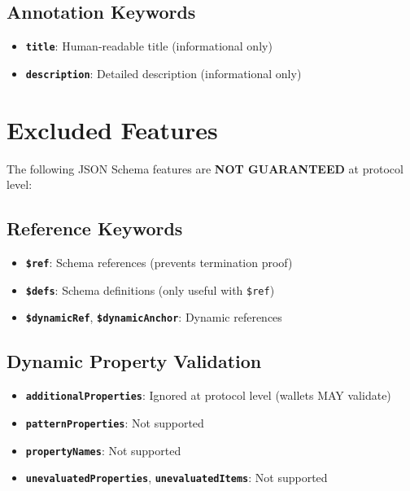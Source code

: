 \subsection{Annotation Keywords}

\begin{itemize}
  \item \textbf{\texttt{title}}: Human-readable title (informational only)
  \item \textbf{\texttt{description}}: Detailed description (informational only)
\end{itemize}

\section{Excluded Features}

The following JSON Schema features are \textbf{NOT GUARANTEED} at protocol level:

\subsection{Reference Keywords}

\begin{itemize}
  \item \textbf{\texttt{\$ref}}: Schema references (prevents termination proof)
  \item \textbf{\texttt{\$defs}}: Schema definitions (only useful with \texttt{\$ref})
  \item \textbf{\texttt{\$dynamicRef}}, \textbf{\texttt{\$dynamicAnchor}}: Dynamic references
\end{itemize}

\subsection{Dynamic Property Validation}

\begin{itemize}
  \item \textbf{\texttt{additionalProperties}}: Ignored at protocol level (wallets MAY validate)
  \item \textbf{\texttt{patternProperties}}: Not supported
  \item \textbf{\texttt{propertyNames}}: Not supported
  \item \textbf{\texttt{unevaluatedProperties}}, \textbf{\texttt{unevaluatedItems}}: Not supported
\end{itemize}

